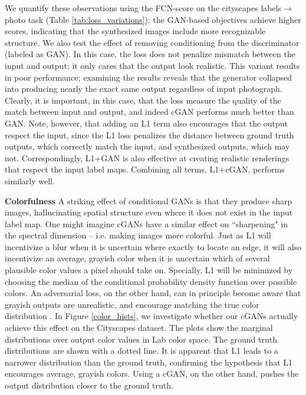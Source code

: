 \documentclass[10pt,twocolumn,letterpaper]{article}
\begin{document}
We quantify these observations using the FCN-score on the cityscapes labels$\rightarrow$photo task (Table \ref{tab:loss_variations}): the GAN-based objectives achieve higher scores, indicating that the synthesized images include more recognizable structure. We also test the effect of removing conditioning from the discriminator (labeled as GAN). In this case, the loss does not penalize mismatch between the input and output; it only cares that the output look realistic. This variant results in poor performance; examining the results reveals that the generator collapsed into producing nearly the exact same output regardless of input photograph. Clearly, it is important, in this case, that the loss measure the quality of the match between input and output, and indeed cGAN performs much better than GAN. Note, however, that adding an L1 term also encourages that the output respect the input, since the L1 loss penalizes the distance between ground truth outputs, which correctly match the input, and synthesized outputs, which may not. Correspondingly, L1+GAN is also effective at creating realistic renderings that respect the input label maps. Combining all terms, L1+cGAN, performs similarly well.



{\bf Colorfulness} A striking effect of conditional GANs is that they produce sharp images, hallucinating spatial structure even where it does not exist in the input label map. One might imagine cGANs have a similar effect on ``sharpening" in the spectral dimension -- i.e. making images more colorful. Just as L1 will incentivize a blur when it is uncertain where exactly to locate an edge, it will also incentivize an average, grayish color when it is uncertain which of several plausible color values a pixel should take on. Specially, L1 will be minimized by choosing the median of the conditional probability density function over possible colors. An adversarial loss, on the other hand, can in principle become aware that grayish outputs are unrealistic, and encourage matching the true color distribution \cite{goodfellow2014generative}. In Figure \ref{color_hists}, we investigate whether our cGANs actually achieve this effect on the Cityscapes dataset. The plots show the marginal distributions over output color values in Lab color space. The ground truth distributions are shown with a dotted line. It is apparent that L1 leads to a narrower distribution than the ground truth, confirming the hypothesis that L1 encourages average, grayish colors. Using a cGAN, on the other hand, pushes the output distribution closer to the ground truth.
\end{document}
